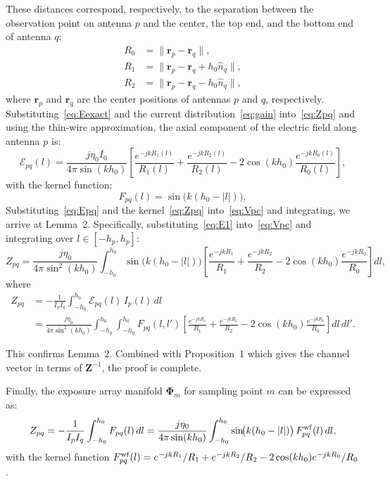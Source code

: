 \documentclass[journal]{IEEEtran}
\begin{document}
These distances correspond, respectively, to the separation between the observation point on antenna $p$ and the center, the top end, and the bottom end of antenna $q$:
\begin{align}
    R_0 &= \|\mathbf{r}_p - \mathbf{r}_q\|, \\
    R_1 &= \|\mathbf{r}_p - \mathbf{r}_q + h_0\hat{n}_q\|, \\
    R_2 &= \|\mathbf{r}_p - \mathbf{r}_q - h_0\hat{n}_q\|,
\end{align}
where $\mathbf{r}_p$ and $\mathbf{r}_q$ are the center positions of antennas $p$ and $q$, respectively. Substituting~\eqref{eq:Eexact} and the current distribution~\eqref{eq:gain} into~\eqref{eq:Zpq} and using the thin-wire approximation, the axial component of the electric field along antenna $p$ is:
\begin{equation}
    \mathcal{E}_{pq}(l) = \frac{j\eta_0 I_0}{4\pi\sin(kh_0)}
    \left[\frac{e^{-jkR_1(l)}}{R_1(l)} + \frac{e^{-jkR_2(l)}}{R_2(l)}
    - 2\cos(kh_0)\frac{e^{-jkR_0(l)}}{R_0(l)}\right],
    \label{eq:Epq}
\end{equation}
with the kernel function:
\begin{equation}
    F_{pq}(l) = \sin\!\bigl(k(h_0 - |l|)\bigr),
\end{equation}
Substituting~\eqref{eq:Epq} and the kernel~\eqref{eq:Zpq} into~\eqref{eq:Vpc} and integrating, we arrive at Lemma~2. Specifically, substituting~\eqref{eq:E1} into~\eqref{eq:Vpc} and integrating over $l \in [-h_p, h_p]$:
\begin{equation}
    Z_{pq} = \frac{j\eta_0}{4\pi\sin^2(kh_0)}\int_{-h_0}^{h_0}\sin\!\bigl(k(h_0 - |l|)\bigr)
    \left[\frac{e^{-jkR_1}}{R_1} + \frac{e^{-jkR_2}}{R_2} - 2\cos(kh_0)\frac{e^{-jkR_0}}{R_0}\right]dl,
    \label{eq:Zpq_final}
\end{equation}
where
\begin{align}
    Z_{pq} &= -\frac{1}{I_p I_q}\int_{-h_0}^{h_0} \mathcal{E}_{pq}(l)\,I_p(l)\,dl \\
    &= \frac{j\eta_0}{4\pi\sin^2(kh_0)}\int_{-h_0}^{h_0}\!\!\int_{-h_0}^{h_0} F_{pq}(l, l')
    \left[\frac{e^{-jkR_1}}{R_1} + \frac{e^{-jkR_2}}{R_2} - 2\cos(kh_0)\frac{e^{-jkR_0}}{R_0}\right]dl\,dl'.
\end{align}

This confirms Lemma~2. Combined with Proposition~1 which gives the channel vector in terms of $\mathbf{Z}^{-1}$, the proof is complete.

Finally, the exposure array manifold $\boldsymbol{\Phi}_m$ for sampling point $m$ can be expressed as:
\begin{equation}
    Z_{pq} = -\frac{1}{I_p I_q}\int_{-h_0}^{h_0} F_{pq}(l)\,dl
    = \frac{j\eta_0}{4\pi\sin(kh_0)}\int_{-h_0}^{h_0} \sin\!\bigl(k(h_0 - |l|)\bigr)\,F_{pq}^{\rm{wf}}(l)\,dl,
    \label{eq:Zpq_confirm}
\end{equation}
with the kernel function $F_{pq}^{\rm{wf}}(l) = e^{-jkR_1}/R_1 + e^{-jkR_2}/R_2 - 2\cos(kh_0)e^{-jkR_0}/R_0$.
\end{document}
